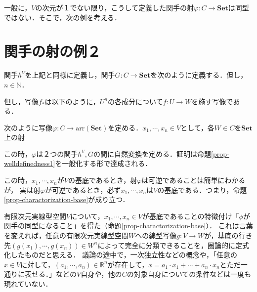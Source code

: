 \documentclass[uplatex, 12pt, dvipdfmx]{jsreport}
\begin{document}
一般に，$V$の次元が１でない限り，こうして定義した関手の射$\varphi :C\to\mathbf{Set}$は同型ではない．そこで，次の例を考える．

\section{関手の射の例２}\label{section-vectorspace-2}

関手$h^V$を上記と同様に定義し，関手$G:C\to\mathbf{Set}$を次のように定義する．但し，$n\in\mathbb{N}$．
\begin{center}\end{center}
但し，写像$f_*$は以下のように，$U^n$の各成分について$f:U\to W$を施す写像である．
\begin{center}\end{center}

次のように写像$\varphi :C\to \mathrm{arr}(\mathbf{Set})$を定める．$x_1,\cdots,x_n\in V$として，各$W\in C$を$\mathbf{Set}$上の射
\begin{center}\end{center}
この時，$\varphi$は２つの関手$h^V,G$の間に自然変換を定める．証明は命題\ref{prop-welldefinedness1}を一般化する形で達成される．

この時，$x_1,\cdots,x_n$が$V$の基底であるとき，射$\varphi$は可逆であることは簡単にわかるが，
実は射$\varphi$が可逆であるとき，必ず$x_1,\cdots,x_n$は$V$の基底である．つまり，命題\ref{prop-charactorization-base}が成り立つ．

\begin{screen}
    有限次元実線型空間$V$について，$x_1,\cdots,x_n\in V$が基底であることの特徴付け「$\phi$が関手の同型になること」を得た（命題\ref{prop-charactorization-base}）．
    これは言葉を変えれば，任意の有限次元実線型空間$W$への線型写像$g:V\to W$が，基底の行き先$(g(x_1),\cdots,g(x_n))\in W^n$によって完全に分類できることを，圏論的に定式化したものだと思える．
    議論の途中で，一次独立性などの概念や，「任意の$x\in V$に対して，$(a_1,\cdots,a_n)\in\mathbb{R}^n$が存在して，$x=a_1\cdot x_1 + \cdots + a_n\cdot x_n$とただ一通りに表せる．」などの$V$自身や，他の$C$の対象自身についての条件などは一度も現れていない．
\end{screen}
\end{document}
